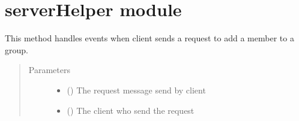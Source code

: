 \documentclass[letterpaper,10pt,english]{sphinxmanual}
\begin{document}
\section{serverHelper module}
\label{\detokenize{serverHelper:module-serverHelper}}\label{\detokenize{serverHelper:serverhelper-module}}\label{\detokenize{serverHelper::doc}}

\begin{fulllineitems}
\label{\detokenize{serverHelper:serverHelper.addMember}}
This method handles events when client sends a request to add a member to a group.
\begin{quote}\begin{description}
\item[{Parameters}] \leavevmode\begin{itemize}
\item {} 
 () \textendash{} The request message send by client

\item {} 
 () \textendash{} The client who send the request

\end{itemize}

\end{description}\end{quote}

\end{fulllineitems}

\end{document}
